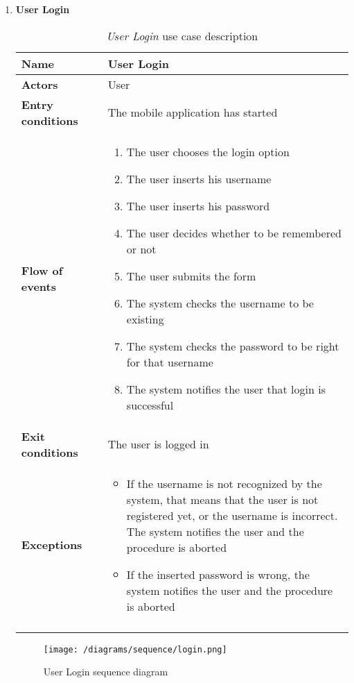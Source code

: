 \begin{enumerate}
				\FloatBarrier
			\item \textbf{User Login}
				\begin{longtable}{p{0.26\linewidth}p{0.75\linewidth}}
					\toprule
					\textbf{Name} & \textbf{User Login} \\
					\midrule
					\textbf{Actors} & User \\
					\midrule
					\textbf{Entry conditions} & The mobile application has started \\
					\midrule
					\textbf{Flow of events} & 
					\begin{enumerate}
						\item The user chooses the login option
						\item The user inserts his username
						\item The user inserts his password
						\item The user decides whether to be remembered or not
						\item The user submits the form
						\item The system checks the username to be existing
						\item The system checks the password to be right for that username
						\item The system notifies the user that login is successful
					\end{enumerate} \\
					\midrule
					\textbf{Exit conditions} & The user is logged in\\
					\midrule
					\textbf{Exceptions} & 
					\begin{itemize}
						\item If the username is not recognized by the system, that means that the user is not registered yet, or the username is incorrect. The system notifies the user and the procedure is aborted
						\item If the inserted password is wrong, the system notifies the user and the procedure is aborted			
					\end{itemize} \\
					\bottomrule
					\caption{\emph{User Login} use case description}
				\end{longtable}
			
				\begin{figure}[h]
					\centering
					\texttt{[image: /diagrams/sequence/login.png]}
					\caption{User Login sequence diagram}
				\end{figure}
			

\end{enumerate}
